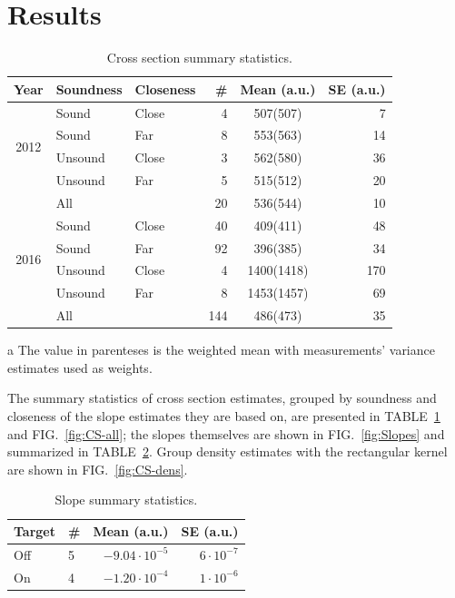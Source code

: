 \documentclass[reprint]{revtex4-1}
\begin{document}
\pagebreak

\section{Results}
\begin{table}
\centering
\begin{threeparttable}
\caption{Cross section summary statistics. \label{tbl:CS-all}}
\begin{tabular}{c|llrcr}
\hline\hline
Year						& Soundness		& Closeness		& \#		& Mean\tnote{a} (a.u.)	& SE (a.u.) \\
\hline
\multirow{4}{*}{2012}		& Sound			& Close			& 4			& 507(507)				& 7  \\
							& Sound			& Far			& 8			& 553(563)				& 14 \\
							& Unsound		& Close			& 3			& 562(580)				& 36 \\
							& Unsound		& Far			& 5			& 515(512)				& 20 \\
							& All			& 				& 20		& 536(544)				& 10 \\
\hline					
\multirow{4}{*}{2016}		& Sound			& Close			& 40		& 409(411)				& 48 \\
							& Sound			& Far			& 92		& 396(385)				& 34 \\
							& Unsound		& Close			& 4			& 1400(1418)			& 170\\
							& Unsound		& Far			& 8			& 1453(1457)			& 69 \\
							& All			& 				& 144		& 486(473)				& 35 \\
\hline\hline
\end{tabular}
\begin{tablenotes}
\item[a] The value in parenteses is the weighted mean with measurements' variance estimates used as weights.
\end{tablenotes}
\end{threeparttable}
\end{table}

The summary statistics of cross section estimates, grouped by soundness and closeness of the slope estimates they are based on, are presented in TABLE~\ref{tbl:CS-all} and FIG.~\ref{fig:CS-all}; the slopes themselves are shown in FIG.~\ref{fig:Slopes} and summarized in TABLE~\ref{tbl:Slp-big}. Group density estimates with the rectangular kernel are shown in FIG.~\ref{fig:CS-dens}.

\begin{table}
\centering
\caption{Slope summary statistics. \label{tbl:Slp-big}}
\begin{tabular}{llrr}
\hline\hline
Target		& \#		& Mean (a.u.)						& SE (a.u.) \\
\hline
Off			& 5			& $-9.04\cdot 10^{-5}$				& $6\cdot 10^{-7}$  \\
On			& 4			& $-1.20\cdot 10^{-4}$				& $1\cdot 10^{-6}$ \\
\end{tabular}
\end{table}
\end{document}
